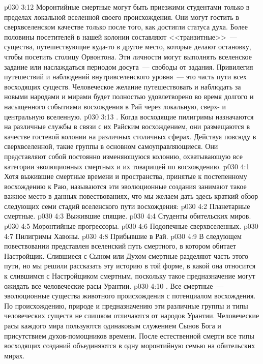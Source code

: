 \vs p030 3:12 Моронтийные смертные могут быть приезжими студентами только в пределах локальной вселенной своего происхождения. Они могут гостить в сверхвселенском качестве только после того, как достигли статуса духа. Более половины посетителей в нашей колонии составляют <<транзитные>>~--- существа, путешествующие куда\hyp{}то в другое место, которые делают остановку, чтобы посетить столицу Орвонтона. Эти личности могут выполнять вселенское задание или наслаждаться периодом досуга~--- свободы от задания. Привилегия путешествий и наблюдений внутривселенского уровня~--- это часть пути всех восходящих существ. Человеческое желание путешествовать и наблюдать за новыми народами и мирами будет полностью удовлетворено во время долгого и насыщенного событиями восхождения в Рай через локальную, сверх\hyp{} и центральную вселенную.
\vs p030 3:13 . Когда восходящие пилигримы назначаются на различные службы в связи с их Райским восхождением, они размещаются в качестве гостевой колонии на различных столичных сферах. Действуя повсюду в сверхвселенной, такие группы в основном самоуправляющиеся. Они представляют собой постоянно изменяющуюся колонию, охватывающую все категории эволюционных смертных и их товарищей по восхождению.
\vs p030 4:1 Хотя выжившие смертные времени и пространства, принятые к постепенному восхождению к Раю, называются  эти эволюционные создания занимают такое важное место в данных повествованиях, что мы желаем дать здесь краткий обзор следующих семи стадий вселенского пути восхождения:
\vs p030 4:2 Планетарные смертные.
\vs p030 4:3 Выжившие спящие.
\vs p030 4:4 Студенты обительских миров.
\vs p030 4:5 Моронтийные прогрессоры.
\vs p030 4:6 Подопечные сверхвселенных.
\vs p030 4:7 Пилигримы Хавоны.
\vs p030 4:8 Прибывшие в Рай.
\vs p030 4:9 \pc В следующем повествовании представлен вселенский путь смертного, в котором обитает Настройщик. Слившиеся с Сыном или Духом смертные разделяют часть этого пути, но мы решили рассказать эту историю в той форме, в какой она относится к слившимся с Настройщиком смертным, поскольку такое предназначение могут ожидать все человеческие расы Урантии.
\vs p030 4:10 . Все смертные~--- эволюционные существа животного происхождения с потенциалом восхождения. По происхождению, природе и предназначению эти различные группы и типы человеческих существ не слишком отличаются от народов Урантии. Человеческие расы каждого мира пользуются одинаковым служением Сынов Бога и присутствием духов\hyp{}помощников времени. После естественной смерти все типы восходящих созданий объединяются в одну моронтийную семью на обительских мирах.
